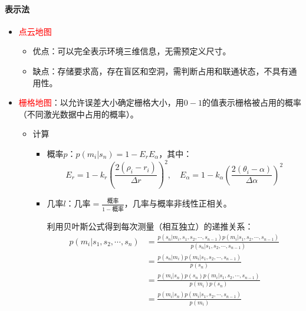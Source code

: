 \documentclass[
12pt, %
a4paper, 
oneside, %
]{scrartcl}
\begin{document}
\paragraph{表示法}
\begin{itemize}
\item \textcolor{red}{点云地图}
\begin{itemize}
\item 优点：可以完全表示环境三维信息，无需预定义尺寸。
\item 缺点：存储要求高，存在盲区和空洞，需判断占用和联通状态，不具有通用性。
\end{itemize}
\item \textcolor{red}{栅格地图}：以允许误差大小确定栅格大小，用$ 0 - 1 $的值表示栅格被占用的概率（不同激光数据中占用的概率）。
\begin{itemize}
\item 计算
\begin{itemize}
\item 概率$ p $：$ p(m_i|s_n) = 1 - E_r E_\alpha $，其中：
$$ E_r = 1 - k_r(\frac{2(\rho_i - r_i)}{\Delta r})^2, \quad E_\alpha = 1 - k_\alpha(\frac{2(\theta_i - \alpha)}{\Delta \alpha})^2 $$
\item 几率$ l $：$ \text{几率} = \frac{\text{概率}}{1 - \text{概率}} $，几率与概率非线性正相关。

利用贝叶斯公式得到每次测量（相互独立）的递推关系：
\begin{align*}
p(m_i|s_1, s_2, \cdots, s_n)
& = \frac{p(s_n|m_i, s_1, s_2, \cdots, s_{n - 1})p(m_i|s_1, s_2, \cdots, s_{n - 1})}{p(s_n|s_1, s_2, \cdots, s_{n - 1})} \\
&= \frac{p(s_n|m_i)p(m_i|s_1, s_2, \cdots, s_{n - 1})}{p(s_n)} \\
&= \frac{p(m_i|s_n)p(s_n)p(m_i|s_1, s_2, \cdots, s_{n - 1})}{p(m_i)p(s_n)} \\
&= \frac{p(m_i|s_n)p(m_i|s_1, s_2, \cdots, s_{n - 1})}{p(m_i)}
\end{align*}


\end{itemize}
\end{itemize}
\end{itemize}
\end{document}
